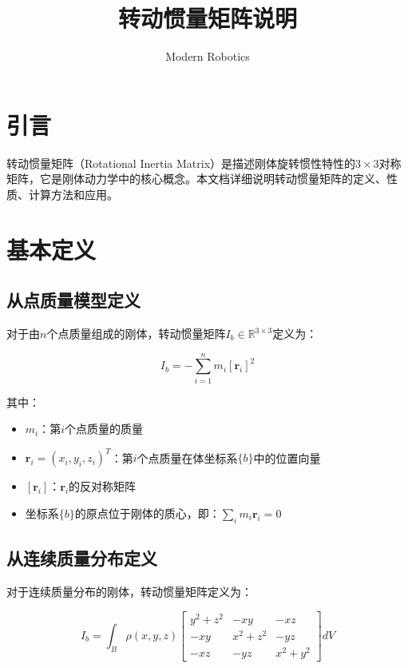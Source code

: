 \documentclass[12pt,a4paper]{article}
\title{转动惯量矩阵说明}
\author{Modern Robotics}
\date{}
\begin{document}
\maketitle

\section{引言}

转动惯量矩阵（Rotational Inertia Matrix）是描述刚体旋转惯性特性的$3 \times 3$对称矩阵，它是刚体动力学中的核心概念。本文档详细说明转动惯量矩阵的定义、性质、计算方法和应用。

\section{基本定义}

\subsection{从点质量模型定义}

对于由$n$个点质量组成的刚体，转动惯量矩阵$I_b \in \mathbb{R}^{3 \times 3}$定义为：

\begin{equation}
I_b = -\sum_{i=1}^{n} m_i [\bm{r}_i]^2
\label{eq:inertia_discrete}
\end{equation}

其中：
\begin{itemize}
\item $m_i$：第$i$个点质量的质量
\item $\bm{r}_i = (x_i, y_i, z_i)^T$：第$i$个点质量在体坐标系$\{b\}$中的位置向量
\item $[\bm{r}_i]$：$\bm{r}_i$的反对称矩阵
\item 坐标系$\{b\}$的原点位于刚体的质心，即：$\sum_i m_i \bm{r}_i = 0$
\end{itemize}

\subsection{从连续质量分布定义}

对于连续质量分布的刚体，转动惯量矩阵定义为：

\begin{equation}
I_b = \int_B \rho(x, y, z) \begin{bmatrix}
y^2 + z^2 & -xy & -xz \\
-xy & x^2 + z^2 & -yz \\
-xz & -yz & x^2 + y^2
\end{bmatrix} dV
\label{eq:inertia_continuous}
\end{equation}
\end{document}
